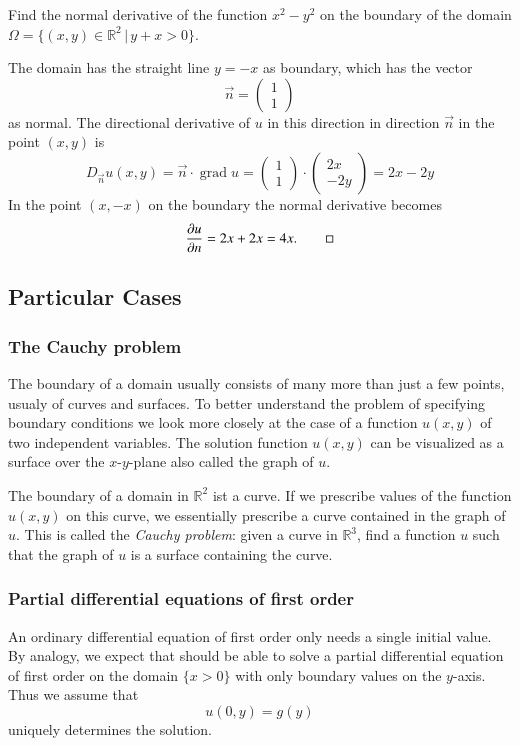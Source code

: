 \begin{beispiel}
Find the normal derivative of the function
$x^2-y^2$
on the boundary of the domain
$\Omega=\{(x,y)\in\mathbb R^2\,|\,y+x>0\}$.

The domain has the straight line
$y=-x$ as boundary, which has the vector
\[
\vec n=\begin{pmatrix}1\\1\end{pmatrix}
\]
as normal.
The directional derivative of $u$ in this direction in direction $\vec{n}$
in the point $(x,y)$ is
\[
D_{\vec n}u(x,y)=\vec n\cdot\operatorname{grad}u
=\begin{pmatrix}1\\1\end{pmatrix}\cdot\begin{pmatrix}2x\\-2y\end{pmatrix}
=2x-2y
\]
In the point $(x,-x)$ on the boundary the normal derivative becomes
\[
\frac{\partial u}{\partial n}
=
2x+2x=4x.
\qedhere
\]
\end{beispiel}

\subsection{Particular Cases\label{klassifikation:randwerte-speziell}}
\subsubsection{The Cauchy problem\label{klassifikation:cauchy-problem}}
The boundary of a domain usually consists of many more than just a few
points, usualy of curves and surfaces.
To better understand the problem of specifying boundary conditions
we look more closely at the case of a function $u(x,y)$ of two independent
variables.
The solution function $u(x,y)$ can be visualized as a surface over the
$x$-$y$-plane also called the graph of $u$.

The boundary of a domain in $\mathbb R^2$ ist a curve.
If we prescribe values of the function $u(x,y)$ on this curve, we
essentially prescribe a curve contained in the graph of $u$.
This is called the {\em Cauchy problem}: given a curve in $\mathbb R^3$, 
find a function $u$ such that the graph of $u$ is a surface containing
the curve.

\subsubsection{Partial differential equations of first order}
An ordinary differential equation of first order only needs a single
initial value.
By analogy, we expect that should be able to solve a partial differential
equation of first order on the domain $\{x>0\}$ with only boundary values
on the $y$-axis.
Thus we assume that 
\[
u(0,y)=g(y)
\]
uniquely determines the solution.

